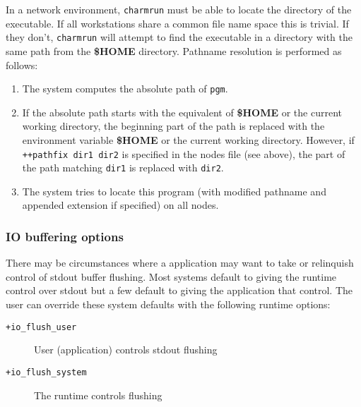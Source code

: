 In a network environment, {\tt charmrun} must
be able to locate the directory of the executable.  If all workstations
share a common file name space this is trivial.  If they don't, {\tt charmrun}
will attempt to find the executable in a directory with the same path
from the {\bf \$HOME} directory.  Pathname resolution is performed as 
follows:
\begin{enumerate}
	\item The system computes the absolute path of {\tt pgm}.
	\item If the absolute path starts with the equivalent of {\bf \$HOME} 
	or the current working directory, the beginning part of the 
        path 
	is replaced with the environment variable {\bf \$HOME} or the 
	current working directory. However, if {\tt ++pathfix dir1 dir2} is 
        specified in the nodes file (see above), the part of
        the path matching {\tt dir1} is replaced with {\tt dir2}.
	\item The system tries to locate this program (with modified 
	pathname and appended extension if specified) on all nodes.
\end{enumerate}

\subsubsection{IO buffering options}
\label{io buffer options}
There may be circumstances where a \charmpp{} application may want to take
or relinquish control of stdout buffer flushing. Most systems default to
giving the \charmpp{} runtime control over stdout but a few default to
giving the application that control. The user can override these system
defaults with the following runtime options:

\begin{description}
\item[{\tt +io\_flush\_user}]     User (application) controls stdout flushing
\item[{\tt +io\_flush\_system}]   The \charmpp{} runtime controls flushing
\end{description}
